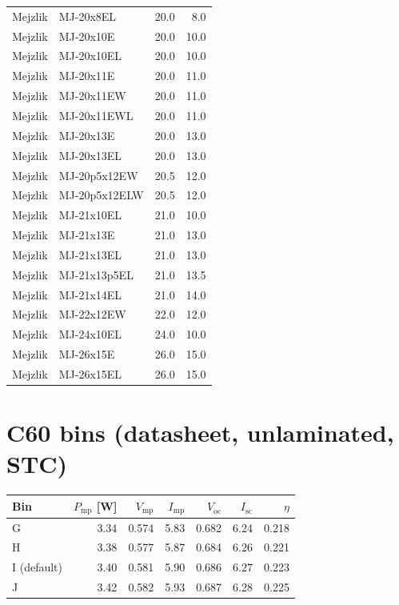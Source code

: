 \documentclass[11pt,letterpaper]{article}
\begin{document}
\begin{center}
\begin{longtable}{@{}llrr@{}}
Mejzlik & MJ-20x8EL & 20.0 & 8.0 \\
Mejzlik & MJ-20x10E & 20.0 & 10.0 \\
Mejzlik & MJ-20x10EL & 20.0 & 10.0 \\
Mejzlik & MJ-20x11E & 20.0 & 11.0 \\
Mejzlik & MJ-20x11EW & 20.0 & 11.0 \\
Mejzlik & MJ-20x11EWL & 20.0 & 11.0 \\
Mejzlik & MJ-20x13E & 20.0 & 13.0 \\
Mejzlik & MJ-20x13EL & 20.0 & 13.0 \\
Mejzlik & MJ-20p5x12EW & 20.5 & 12.0 \\
Mejzlik & MJ-20p5x12ELW & 20.5 & 12.0 \\
Mejzlik & MJ-21x10EL & 21.0 & 10.0 \\
Mejzlik & MJ-21x13E & 21.0 & 13.0 \\
Mejzlik & MJ-21x13EL & 21.0 & 13.0 \\
Mejzlik & MJ-21x13p5EL & 21.0 & 13.5 \\
Mejzlik & MJ-21x14EL & 21.0 & 14.0 \\
Mejzlik & MJ-22x12EW & 22.0 & 12.0 \\
Mejzlik & MJ-24x10EL & 24.0 & 10.0 \\
Mejzlik & MJ-26x15E & 26.0 & 15.0 \\
Mejzlik & MJ-26x15EL & 26.0 & 15.0 \\
\bottomrule
\end{longtable}
\end{center}

\section{C60 bins (datasheet, unlaminated, STC)}

\begin{center}
\begin{tabular}{@{}lrrrrrr@{}}
\toprule
Bin & $P_\mathrm{mp}$ [W] & $V_\mathrm{mp}$ & $I_\mathrm{mp}$ & $V_\mathrm{oc}$ & $I_\mathrm{sc}$ & $\eta$ \\
\midrule
G & 3.34 & 0.574 & 5.83 & 0.682 & 6.24 & 0.218 \\
H & 3.38 & 0.577 & 5.87 & 0.684 & 6.26 & 0.221 \\
I (default) & 3.40 & 0.581 & 5.90 & 0.686 & 6.27 & 0.223 \\
J & 3.42 & 0.582 & 5.93 & 0.687 & 6.28 & 0.225 \\
\bottomrule
\end{tabular}
\end{center}
\end{document}
